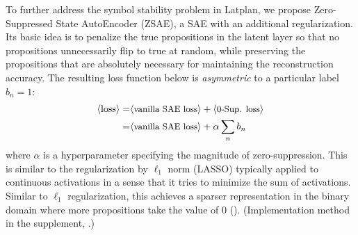 
To further address the symbol stability problem in Latplan,
we propose Zero-Suppressed State AutoEncoder (ZSAE),
a SAE with an additional regularization.
% 
Its basic idea is to penalize the
true propositions in the latent layer so that no propositions unnecessarily flip to true at random,
while preserving the propositions that are absolutely necessary for maintaining the reconstruction accuracy.
% 
The resulting loss function below is 
\emph{asymmetric} to a particular label $b_n=1$:
\begin{align*}
 \brackets{\text{loss}} = & \brackets{\text{\small vanilla SAE loss}} + \brackets{\text{\small 0-Sup. loss}} \\ 
 =                        & \brackets{\text{\small vanilla SAE loss}} + \alpha \sum_n b_n %
\end{align*}
where $\alpha$ is a hyperparameter specifying the magnitude of zero-suppression.
This is similar to the regularization by $\ell_1$ norm (LASSO) typically applied to continuous activations
in a sense that it tries to minimize the sum of activations.
Similar to $\ell_1$ regularization, this achieves a sparser representation in the binary domain where
more propositions take the value of 0 ().
(Implementation method in the supplement, .)


